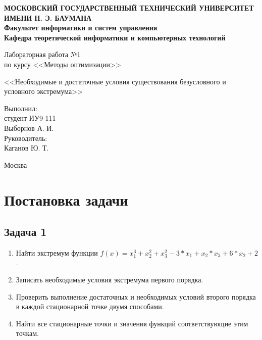 \documentclass[12pt,a4paper,oneside]{extarticle}
\begin{document}
\pgfplotsset{compat=1.8}

\thispagestyle{empty}
\newpage
{
\centering


\textbf{
МОСКОВСКИЙ ГОСУДАРСТВЕННЫЙ ТЕХНИЧЕСКИЙ УНИВЕРСИТЕТ ИМЕНИ Н. Э. БАУМАНА \\
Факультет информатики и систем управления \\
Кафедра теоретической информатики и компьютерных технологий}
\bigskip
\bigskip
\bigskip
\bigskip
\bigskip
\bigskip
\bigskip

\vfill


Лабораторная работа №1 \\
по курсу <<Методы оптимизации>>

\bigskip

{\large <<Необходимые и достаточные условия существования безусловного и условного экстремума>>}
\bigskip

\vfill



\hfill\parbox{4cm} {
Выполнил:\\
студент ИУ9-111 \hfill \\
Выборнов А. И.\hfill \medskip\\
Руководитель:\\
Каганов Ю. Т.\hfill
}


\vspace{\fill}

Москва \number\year
\clearpage
}



\clearpage

\section{Постановка задачи}
    \subsection {Задача 1}
        \begin{enumerate}
            \item Найти экстремум функции $f(x) = x_1^3 + x_2^2 + x_3^2 - 3*x_1 + x_2*x_3 + 6*x_2 + 2$. 
            \item Записать необходимые условия экстремума первого порядка.
            \item Проверить выполнение достаточных и необходимых условий второго порядка в каждой стационарной точке двумя способами.
            \item Найти все стационарные точки и значения функций соответствующие этим точкам.
        \end{enumerate}
\end{document}
